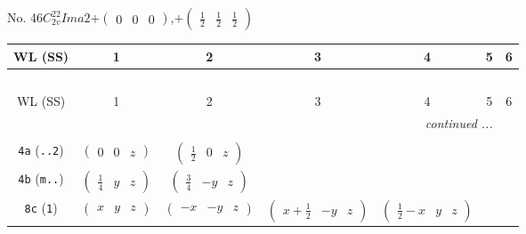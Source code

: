 \documentclass[fleqn,9pt,landscape]{jsarticle}
\begin{document}
\newpage
No. 46\quad$C_{2v}^{22}$\quad$Ima2$\quad[ orthorhombic ]\quad$+\begin{pmatrix} 0 & 0 & 0 \end{pmatrix}$,\quad $+\begin{pmatrix} \frac{1}{2} & \frac{1}{2} & \frac{1}{2} \end{pmatrix}$
\begin{center}
\renewcommand{\arraystretch}{1.2}
\begin{longtable}{ccccccc}
 \hline \hline
WL (SS) & 1 & 2 & 3 & 4 & 5 & 6 \\ \hline \endfirsthead

\multicolumn{6}{l}{\tablename\ \thetable{}} \\
 \hline \hline
WL (SS) & 1 & 2 & 3 & 4 & 5 & 6 \\ \hline \endhead

 \hline \hline
\multicolumn{6}{r}{\footnotesize\it continued ...} \\ \endfoot

 \hline \hline
\multicolumn{6}{r}{} \\ \endlastfoot

{\tt 4a} ({\tt ..2}) & $ \begin{pmatrix} 0 & 0 & z \end{pmatrix} $ & $ \begin{pmatrix} \frac{1}{2} & 0 & z \end{pmatrix} $ & $  $ & $  $ \\ \hline
{\tt 4b} ({\tt m..}) & $ \begin{pmatrix} \frac{1}{4} & y & z \end{pmatrix} $ & $ \begin{pmatrix} \frac{3}{4} & - y & z \end{pmatrix} $ & $  $ & $  $ \\ \hline
{\tt 8c} ({\tt 1}) & $ \begin{pmatrix} x & y & z \end{pmatrix} $ & $ \begin{pmatrix} - x & - y & z \end{pmatrix} $ & $ \begin{pmatrix} x + \frac{1}{2} & - y & z \end{pmatrix} $ & $ \begin{pmatrix} \frac{1}{2} - x & y & z \end{pmatrix} $ \\
\end{longtable}
\end{center}
\end{document}
